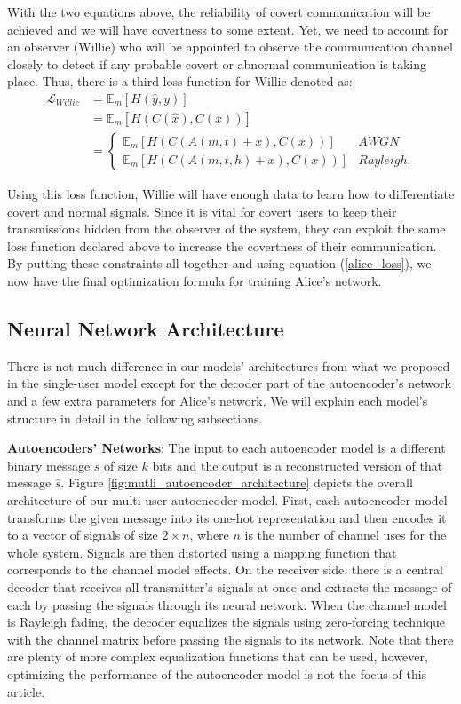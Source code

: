 With the two equations above, the reliability of covert communication will be achieved and we will have covertness to some extent. Yet, we need to account for an observer (Willie) who will be appointed to observe the communication channel closely to detect if any probable covert or abnormal communication is taking place. Thus, there is a third loss function for Willie denoted as:
\begin{equation}
	\begin{aligned} \label{multi_willie_loss}
		\mathcal{L}_{Willie} & = \mathbb{E}_{m}[H(\hat{y}, y)] \\
		& = \mathbb{E}_{m}[H(C(\hat{x}), C(x))] \\
		& = \begin{cases}
			\mathbb{E}_{m}[H(C(A(m,t) + x), C(x))] & AWGN \\
			\mathbb{E}_{m}[H(C(A(m,t,h) + x), C(x))] & Rayleigh.
			\end{cases}
	\end{aligned}
\end{equation}

Using this loss function, Willie will have enough data to learn how to differentiate covert and normal signals. Since it is vital for covert users to keep their transmissions hidden from the observer of the system, they can exploit the same loss function declared above to increase the covertness of their communication. By putting these constraints all together and using equation (\ref{alice_loss}), we now have the final optimization formula for training Alice's network.

\subsection{Neural Network Architecture}
There is not much difference in our models' architectures from what we proposed in the single-user model except for the decoder part of the autoencoder's network and a few extra parameters for Alice's network. We will explain each model's structure in detail in the following subsections.

\textbf{Autoencoders' Networks}: The input to each autoencoder model is a different binary message \(s\) of size \(k\) bits and the output is a reconstructed version of that message \(\hat{s}\). Figure \ref{fig:mutli_autoencoder_architecture} depicts the overall architecture of our multi-user autoencoder model. First, each autoencoder model transforms the given message into its one-hot representation and then encodes it to a vector of signals of size \(2 \times n\), where \(n\) is the number of channel uses for the whole system. Signals are then distorted using a mapping function that corresponds to the channel model effects. On the receiver side, there is a central decoder that receives all transmitter's signals at once and extracts the message of each by passing the signals through its neural network. When the channel model is Rayleigh fading, the decoder equalizes the signals using zero-forcing technique with the channel matrix before passing the signals to its network. Note that there are plenty of more complex equalization functions that can be used, however, optimizing the performance of the autoencoder model is not the focus of this article.

